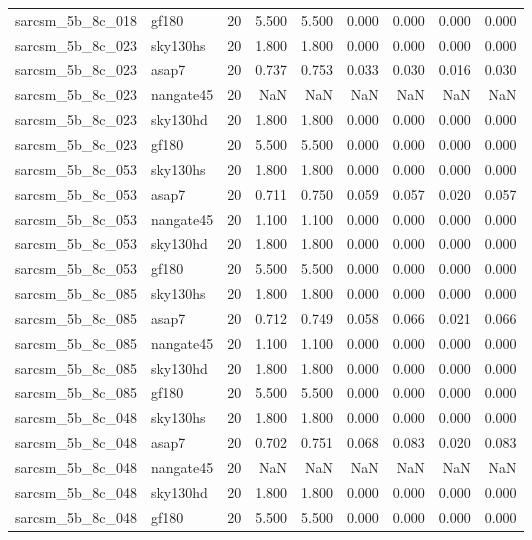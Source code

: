 \begin{tabular}{llrrrrrrr}
sarcsm\_5b\_8c\_018 & gf180 & 20 & 5.500 & 5.500 & 0.000 & 0.000 & 0.000 & 0.000 \\
sarcsm\_5b\_8c\_023 & sky130hs & 20 & 1.800 & 1.800 & 0.000 & 0.000 & 0.000 & 0.000 \\
sarcsm\_5b\_8c\_023 & asap7 & 20 & 0.737 & 0.753 & 0.033 & 0.030 & 0.016 & 0.030 \\
sarcsm\_5b\_8c\_023 & nangate45 & 20 & NaN & NaN & NaN & NaN & NaN & NaN \\
sarcsm\_5b\_8c\_023 & sky130hd & 20 & 1.800 & 1.800 & 0.000 & 0.000 & 0.000 & 0.000 \\
sarcsm\_5b\_8c\_023 & gf180 & 20 & 5.500 & 5.500 & 0.000 & 0.000 & 0.000 & 0.000 \\
sarcsm\_5b\_8c\_053 & sky130hs & 20 & 1.800 & 1.800 & 0.000 & 0.000 & 0.000 & 0.000 \\
sarcsm\_5b\_8c\_053 & asap7 & 20 & 0.711 & 0.750 & 0.059 & 0.057 & 0.020 & 0.057 \\
sarcsm\_5b\_8c\_053 & nangate45 & 20 & 1.100 & 1.100 & 0.000 & 0.000 & 0.000 & 0.000 \\
sarcsm\_5b\_8c\_053 & sky130hd & 20 & 1.800 & 1.800 & 0.000 & 0.000 & 0.000 & 0.000 \\
sarcsm\_5b\_8c\_053 & gf180 & 20 & 5.500 & 5.500 & 0.000 & 0.000 & 0.000 & 0.000 \\
sarcsm\_5b\_8c\_085 & sky130hs & 20 & 1.800 & 1.800 & 0.000 & 0.000 & 0.000 & 0.000 \\
sarcsm\_5b\_8c\_085 & asap7 & 20 & 0.712 & 0.749 & 0.058 & 0.066 & 0.021 & 0.066 \\
sarcsm\_5b\_8c\_085 & nangate45 & 20 & 1.100 & 1.100 & 0.000 & 0.000 & 0.000 & 0.000 \\
sarcsm\_5b\_8c\_085 & sky130hd & 20 & 1.800 & 1.800 & 0.000 & 0.000 & 0.000 & 0.000 \\
sarcsm\_5b\_8c\_085 & gf180 & 20 & 5.500 & 5.500 & 0.000 & 0.000 & 0.000 & 0.000 \\
sarcsm\_5b\_8c\_048 & sky130hs & 20 & 1.800 & 1.800 & 0.000 & 0.000 & 0.000 & 0.000 \\
sarcsm\_5b\_8c\_048 & asap7 & 20 & 0.702 & 0.751 & 0.068 & 0.083 & 0.020 & 0.083 \\
sarcsm\_5b\_8c\_048 & nangate45 & 20 & NaN & NaN & NaN & NaN & NaN & NaN \\
sarcsm\_5b\_8c\_048 & sky130hd & 20 & 1.800 & 1.800 & 0.000 & 0.000 & 0.000 & 0.000 \\
sarcsm\_5b\_8c\_048 & gf180 & 20 & 5.500 & 5.500 & 0.000 & 0.000 & 0.000 & 0.000 \\

\end{tabular}
